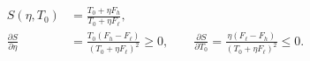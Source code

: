 \begin{align}
 S(\eta,T_0)&=\frac{T_0+\eta F_h}{T_0+\eta F_\ell},
 \label{eq:8-refinement-sensitivity}\\
 \frac{\partial S}{\partial\eta}
 &=\frac{T_0(F_h-F_\ell)}{(T_0+\eta F_\ell)^2}\geq0,\qquad
 \frac{\partial S}{\partial T_0}
 =\frac{\eta(F_\ell-F_h)}{(T_0+\eta F_\ell)^2}\leq0.\nonumber
\end{align}
